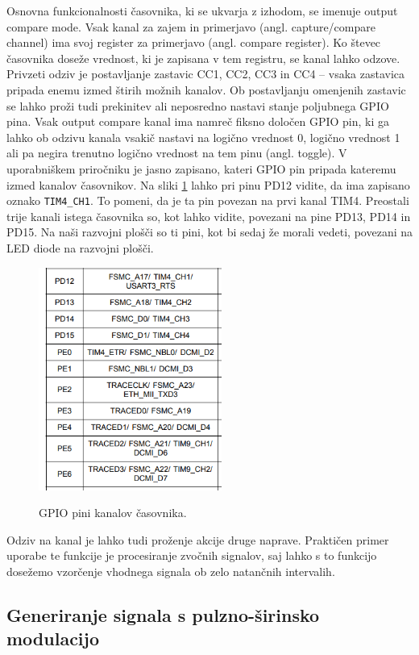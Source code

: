 \documentclass[12pt,letterpaper]{article}
\begin{document}
Osnovna funkcionalnosti časovnika, ki se ukvarja z izhodom, se imenuje output compare mode. Vsak kanal za zajem in primerjavo (angl. capture/compare channel) ima svoj register za primerjavo (angl. compare register). Ko števec časovnika doseže vrednost, ki je zapisana v tem registru, se kanal lahko odzove. Privzeti odziv je postavljanje zastavic CC1, CC2, CC3 in CC4 -- vsaka zastavica pripada enemu izmed štirih možnih kanalov. Ob postavljanju omenjenih zastavic se lahko proži tudi prekinitev ali neposredno nastavi stanje poljubnega GPIO pina. Vsak output compare kanal ima namreč fiksno določen GPIO pin, ki ga lahko ob odzivu kanala vsakič nastavi na logično vrednost 0, logično vrednost 1 ali pa negira trenutno logično vrednost na tem pinu (angl. toggle). V uporabniškem priročniku je jasno zapisano, kateri GPIO pin pripada kateremu izmed kanalov časovnikov. Na sliki \ref{oc_channel_gpio} lahko pri pinu PD12 vidite, da ima zapisano oznako \texttt{TIM4\_CH1}. To pomeni, da je ta pin povezan na prvi kanal TIM4. Preostali trije kanali istega časovnika so, kot lahko vidite, povezani na pine PD13, PD14 in PD15. Na naši razvojni plošči so ti pini, kot bi sedaj že morali vedeti, povezani na LED diode na razvojni plošči.

\begin{figure}[ht!]
  \centering
  \caption{GPIO pini kanalov časovnika.}
  \includegraphics[width=170pt]{images/vaja7/oc_channel_gpio.png}
  \label{oc_channel_gpio}
\end{figure}

Odziv na kanal je lahko tudi proženje akcije druge naprave. Praktičen primer uporabe te funkcije je procesiranje zvočnih signalov, saj lahko s to funkcijo dosežemo vzorčenje vhodnega signala ob zelo natančnih intervalih.

\subsection*{Generiranje signala s pulzno-širinsko modulacijo}
\end{document}
